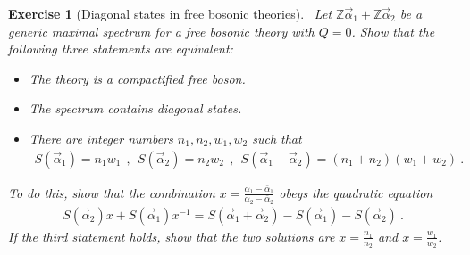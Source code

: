 \documentclass[12pt, a4paper, notitlepage, twoside]{report}
\numberwithin{equation}{section}
\theoremstyle{break}
\newtheorem{exo}{Exercise}[chapter]
\begin{document}
\begin{exo}[Diagonal states in free bosonic theories]
 ~\label{exofbd}
 Let $\mathbb{Z}\vec\alpha_1+\mathbb{Z}\vec\alpha_2$ be a generic maximal spectrum for a free bosonic theory with $Q=0$.
 Show that the following three statements are equivalent:
 \begin{itemize}
  \item The theory is a compactified free boson.
  \item The spectrum contains diagonal states.
  \item There are integer numbers $n_1,n_2,w_1,w_2$ such that 
  \begin{align}
  S(\vec\alpha_1)=n_1w_1 \ \ , \ \  S(\vec\alpha_2)=n_2w_2\ \ ,\ \  S(\vec\alpha_1+\vec\alpha_2) = (n_1+n_2)(w_1+w_2)\ .
  \end{align}
 \end{itemize}
To do this, show that the combination $x=\frac{\alpha_1-\bar{\alpha}_1}{\alpha_2-\bar{\alpha}_2}$ obeys the quadratic equation 
\begin{align}
S(\vec\alpha_2)x+ S(\vec\alpha_1)x^{-1} = S(\vec\alpha_1+\vec\alpha_2) -S(\vec\alpha_1)-  S(\vec\alpha_2)\ .
\end{align}
If the third statement holds, show that the two solutions are $x=\frac{n_1}{n_2}$ and $x=\frac{w_1}{w_2}$.
\end{exo}
\end{document}
